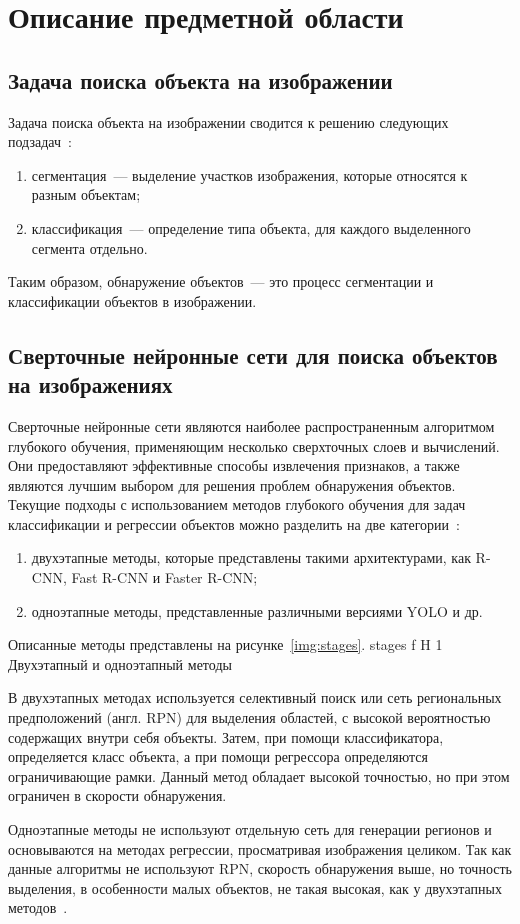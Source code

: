 \chapter{Описание предметной области}

\section{Задача поиска объекта на изображении}

Задача поиска объекта на изображении сводится к решению следующих подзадач~\cite{task}: 
\begin{enumerate}
	\item сегментация~--- выделение участков изображения, которые относятся к разным объектам;
	\item классификация~--- определение типа объекта, для каждого выделенного сегмента отдельно.
\end{enumerate}
Таким образом, обнаружение объектов~--- это процесс сегментации и классификации объектов в изображении. 

\section{Сверточные нейронные сети для поиска объектов на изображениях}

Сверточные нейронные сети являются наиболее распространенным алгоритмом глубокого обучения, применяющим несколько сверхточных слоев и вычислений.
Они предоставляют эффективные способы извлечения признаков, а также являются лучшим выбором для решения проблем обнаружения объектов.
Текущие подходы с использованием методов глубокого обучения для задач классификации и регрессии объектов можно разделить на две категории~\cite{base}:
\begin{enumerate}
	\item двухэтапные методы, которые представлены такими архитектурами, как R-CNN, Fast R-CNN и Faster R-CNN;
	\item одноэтапные методы, представленные различными версиями YOLO и др.
\end{enumerate}
Описанные методы представлены на рисунке~\ref{img:stages}.
	{stages}
	{f}
	{H}
	{1\textwidth}
	{Двухэтапный и одноэтапный методы}

В двухэтапных методах используется селективный поиск или сеть региональных предположений (англ. RPN) для выделения областей, с высокой вероятностью содержащих внутри себя объекты.
Затем, при помощи классификатора, определяется класс объекта, а при помощи регрессора определяются ограничивающие рамки.
Данный метод обладает высокой точностью, но при этом ограничен в скорости обнаружения.

Одноэтапные методы не используют отдельную сеть для генерации регионов и основываются на методах регрессии, просматривая изображения целиком.
Так как данные алгоритмы не используют RPN, скорость обнаружения выше, но точность выделения, в особенности малых объектов, не такая высокая, как у двухэтапных методов~\cite{base}.